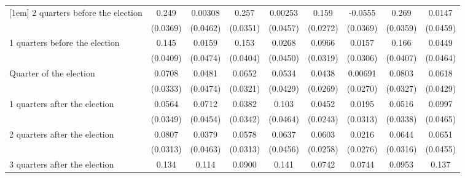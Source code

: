 \begin{table}[htbp]
\begin{tabular}{l*{8}{c}}
[1em]
 2 quarters before the election&       0.249\sym{***}&     0.00308         &       0.257\sym{***}&     0.00253         &       0.159\sym{***}&     -0.0555         &       0.269\sym{***}&      0.0147         \\
                    &    (0.0369)         &    (0.0462)         &    (0.0351)         &    (0.0457)         &    (0.0272)         &    (0.0369)         &    (0.0359)         &    (0.0459)         \\
[1em]
 1 quarters before the election&       0.145\sym{***}&      0.0159         &       0.153\sym{***}&      0.0268         &      0.0966\sym{**} &      0.0157         &       0.166\sym{***}&      0.0449         \\
                    &    (0.0409)         &    (0.0474)         &    (0.0404)         &    (0.0450)         &    (0.0319)         &    (0.0306)         &    (0.0407)         &    (0.0464)         \\
[1em]
Quarter of the election&      0.0708\sym{*}  &      0.0481         &      0.0652\sym{*}  &      0.0534         &      0.0438         &     0.00691         &      0.0803\sym{*}  &      0.0618         \\
                    &    (0.0333)         &    (0.0474)         &    (0.0321)         &    (0.0429)         &    (0.0269)         &    (0.0270)         &    (0.0327)         &    (0.0429)         \\
[1em]
 1 quarters after the election&      0.0564         &      0.0712         &      0.0382         &       0.103\sym{*}  &      0.0452         &      0.0195         &      0.0516         &      0.0997\sym{*}  \\
                    &    (0.0349)         &    (0.0454)         &    (0.0342)         &    (0.0464)         &    (0.0243)         &    (0.0313)         &    (0.0338)         &    (0.0465)         \\
[1em]
 2 quarters after the election&      0.0807\sym{**} &      0.0379         &      0.0578         &      0.0637         &      0.0603\sym{*}  &      0.0216         &      0.0644\sym{*}  &      0.0651         \\
                    &    (0.0313)         &    (0.0463)         &    (0.0313)         &    (0.0456)         &    (0.0258)         &    (0.0276)         &    (0.0316)         &    (0.0455)         \\
[1em]
 3 quarters after the election&       0.134\sym{***}&       0.114\sym{*}  &      0.0900\sym{**} &       0.141\sym{**} &      0.0742\sym{**} &      0.0744\sym{*}  &      0.0953\sym{**} &       0.137\sym{**} \\

\end{tabular}
\end{table}
